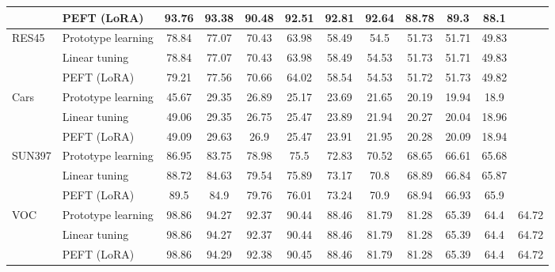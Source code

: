 \begin{tabular}{l l cccccccccc}
 & PEFT (LoRA) & 93.76 & 93.38 & 90.48 & 92.51 & 92.81 & 92.64 & 88.78 & 89.3 & 88.1 \\
\midrule
\multirow{3}{*}{RES45} & Prototype learning & 78.84 & 77.07 & 70.43 & 63.98 & 58.49 & 54.5 & 51.73 & 51.71 & 49.83 \\
 & Linear tuning & 78.84 & 77.07 & 70.43 & 63.98 & 58.49 & 54.53 & 51.73 & 51.71 & 49.83 \\
 & PEFT (LoRA) & 79.21 & 77.56 & 70.66 & 64.02 & 58.54 & 54.53 & 51.72 & 51.73 & 49.82 \\
\midrule
\multirow{3}{*}{Cars} & Prototype learning & 45.67 & 29.35 & 26.89 & 25.17 & 23.69 & 21.65 & 20.19 & 19.94 & 18.9 \\
 & Linear tuning & 49.06 & 29.35 & 26.75 & 25.47 & 23.89 & 21.94 & 20.27 & 20.04 & 18.96 \\
 & PEFT (LoRA) & 49.09 & 29.63 & 26.9 & 25.47 & 23.91 & 21.95 & 20.28 & 20.09 & 18.94 \\
\midrule
\multirow{3}{*}{SUN397} & Prototype learning & 86.95 & 83.75 & 78.98 & 75.5 & 72.83 & 70.52 & 68.65 & 66.61 & 65.68 \\
 & Linear tuning & 88.72 & 84.63 & 79.54 & 75.89 & 73.17 & 70.8 & 68.89 & 66.84 & 65.87 \\
 & PEFT (LoRA) & 89.5 & 84.9 & 79.76 & 76.01 & 73.24 & 70.9 & 68.94 & 66.93 & 65.9 \\
\midrule
\multirow{3}{*}{VOC} & Prototype learning & 98.86 & 94.27 & 92.37 & 90.44 & 88.46 & 81.79 & 81.28 & 65.39 & 64.4 & 64.72 \\
 & Linear tuning & 98.86 & 94.27 & 92.37 & 90.44 & 88.46 & 81.79 & 81.28 & 65.39 & 64.4 & 64.72 \\
 & PEFT (LoRA) & 98.86 & 94.29 & 92.38 & 90.45 & 88.46 & 81.79 & 81.28 & 65.39 & 64.4 & 64.72 \\
\bottomrule
\end{tabular}
